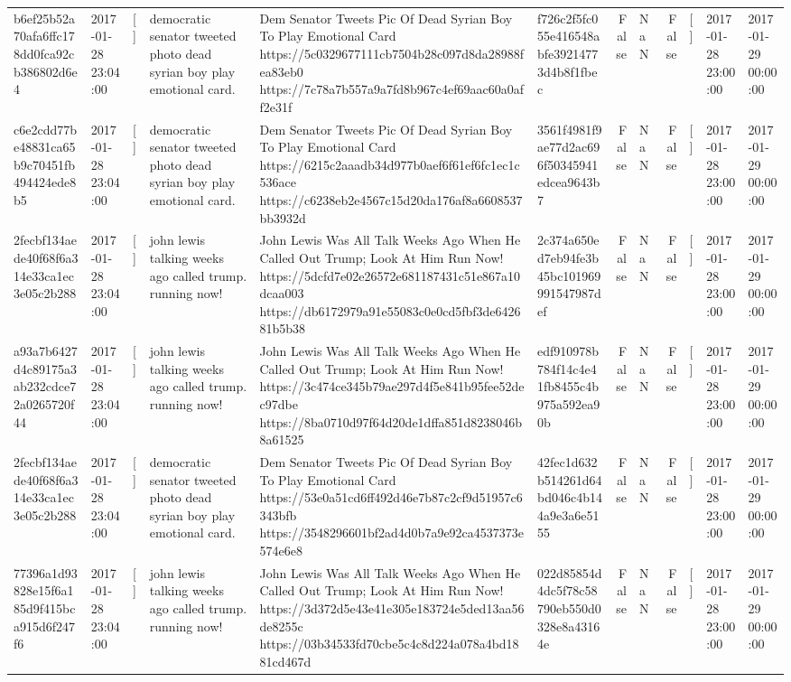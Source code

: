 \begin{tabular}{llllllrlrlll}
b6ef25b52a70afa6ffc178dd0fca92cb386802d6e4 & 2017-01-28 23:04:00 & [] & democratic senator tweeted photo dead syrian boy play emotional card. & Dem Senator Tweets Pic Of Dead Syrian Boy To Play Emotional Card https://5c0329677111cb7504b28c097d8da28988fea83eb0 https://7c78a7b557a9a7fd8b967c4ef69aac60a0aff2e31f & f726c2f5fc055e416548abfe39214773d4b8f1fbec & False & NaN & False & [] & 2017-01-28 23:00:00 & 2017-01-29 00:00:00 \\
c6e2cdd77be48831ca65b9c70451fb494424ede8b5 & 2017-01-28 23:04:00 & [] & democratic senator tweeted photo dead syrian boy play emotional card. & Dem Senator Tweets Pic Of Dead Syrian Boy To Play Emotional Card https://6215c2aaadb34d977b0aef6f61ef6fc1ec1c536ace https://c6238eb2e4567c15d20da176af8a6608537bb3932d & 3561f4981f9ae77d2ac696f50345941edcea9643b7 & False & NaN & False & [] & 2017-01-28 23:00:00 & 2017-01-29 00:00:00 \\
2fecbf134aede40f68f6a314e33ca1ec3e05c2b288 & 2017-01-28 23:04:00 & [] & john lewis talking weeks ago called trump. running now! & John Lewis Was All Talk Weeks Ago When He Called Out Trump; Look At Him Run Now! https://5dcfd7e02e26572e681187431c51e867a10dcaa003 https://db6172979a91e55083c0e0cd5fbf3de642681b5b38 & 2c374a650ed7eb94fe3b45bc101969991547987def & False & NaN & False & [] & 2017-01-28 23:00:00 & 2017-01-29 00:00:00 \\
a93a7b6427d4c89175a3ab232cdce72a0265720f44 & 2017-01-28 23:04:00 & [] & john lewis talking weeks ago called trump. running now! & John Lewis Was All Talk Weeks Ago When He Called Out Trump; Look At Him Run Now! https://3c474ce345b79ae297d4f5e841b95fee52dec97dbe https://8ba0710d97f64d20de1dffa851d8238046b8a61525 & edf910978b784f14c4e41fb8455c4b975a592ea90b & False & NaN & False & [] & 2017-01-28 23:00:00 & 2017-01-29 00:00:00 \\
2fecbf134aede40f68f6a314e33ca1ec3e05c2b288 & 2017-01-28 23:04:00 & [] & democratic senator tweeted photo dead syrian boy play emotional card. & Dem Senator Tweets Pic Of Dead Syrian Boy To Play Emotional Card https://53e0a51cd6ff492d46e7b87c2cf9d51957c6343bfb https://3548296601bf2ad4d0b7a9e92ca4537373e574e6e8 & 42fec1d632b514261d64bd046c4b144a9e3a6e5155 & False & NaN & False & [] & 2017-01-28 23:00:00 & 2017-01-29 00:00:00 \\
77396a1d93828e15f6a185d9f415bca915d6f247f6 & 2017-01-28 23:04:00 & [] & john lewis talking weeks ago called trump. running now! & John Lewis Was All Talk Weeks Ago When He Called Out Trump; Look At Him Run Now! https://3d372d5e43e41e305e183724e5ded13aa56de8255c https://03b34533fd70cbe5c4c8d224a078a4bd1881cd467d & 022d85854d4dc5f78c58790eb550d0328e8a43164e & False & NaN & False & [] & 2017-01-28 23:00:00 & 2017-01-29 00:00:00 \\

\end{tabular}
